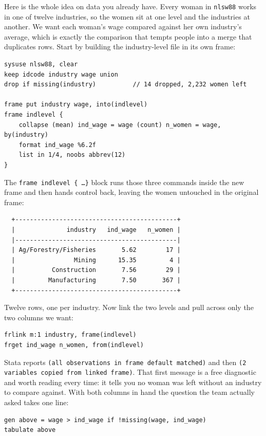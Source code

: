 \documentclass[
    a4paper,
    fontsize=10pt,
    twoside=true,
    numbers=noenddot,
]{kaobook}
\begin{document}
Here is the whole idea on data you already have. Every woman in \texttt{nlsw88} works in one of twelve industries, so the women sit at one level and the industries at another. We want each woman's wage compared against her own industry's average, which is exactly the comparison that tempts people into a merge that duplicates rows. Start by building the industry-level file in its own frame:
\par
{\footnotesize
\begin{verbatim}
sysuse nlsw88, clear
keep idcode industry wage union
drop if missing(industry)          // 14 dropped, 2,232 women left

frame put industry wage, into(indlevel)
frame indlevel {
    collapse (mean) ind_wage = wage (count) n_women = wage, by(industry)
    format ind_wage %6.2f
    list in 1/4, noobs abbrev(12)
}
\end{verbatim}
}
The \texttt{frame indlevel \{ \dots \}} block runs those three commands inside the new frame and then hands control back, leaving the women untouched in the original frame:
\par
{\footnotesize
\begin{verbatim}
  +--------------------------------------------+
  |              industry   ind_wage   n_women |
  |--------------------------------------------|
  | Ag/Forestry/Fisheries       5.62        17 |
  |                Mining      15.35         4 |
  |          Construction       7.56        29 |
  |         Manufacturing       7.50       367 |
  +--------------------------------------------+
\end{verbatim}
}
Twelve rows, one per industry. Now link the two levels and pull across only the two columns we want:
\par
{\footnotesize
\begin{verbatim}
frlink m:1 industry, frame(indlevel)
frget ind_wage n_women, from(indlevel)
\end{verbatim}
}
Stata reports \texttt{(all observations in frame default matched)} and then \texttt{(2 variables copied from linked frame)}. That first message is a free diagnostic and worth reading every time: it tells you no woman was left without an industry to compare against. With both columns in hand the question the team actually asked takes one line:
\par
{\footnotesize
\begin{verbatim}
gen above = wage > ind_wage if !missing(wage, ind_wage)
tabulate above
\end{verbatim}
}
\end{document}
